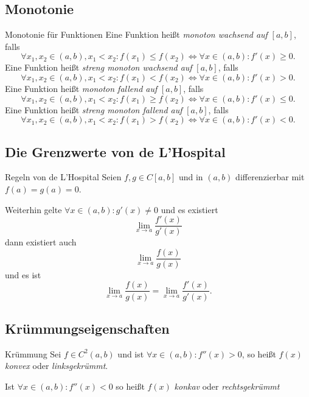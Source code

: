 \documentclass[german]{../spicker}
\begin{document}
\subsection{Monotonie}

\begin{defi}{Monotonie für Funktionen}
    Eine Funktion heißt \emph{monoton wachsend auf} $[a, b]$, falls
    $$
        \forall x_1, x_2 \in (a, b), x_1 < x_2 : f(x_1) \leq f(x_2) \iff \forall x \in (a, b): f'(x) \geq 0.
    $$
    Eine Funktion heißt \emph{streng monoton wachsend auf} $[a, b]$, falls
    $$
        \forall x_1, x_2 \in (a, b), x_1 < x_2 : f(x_1) < f(x_2) \iff \forall x \in (a, b): f'(x) > 0.
    $$
    Eine Funktion heißt \emph{monoton fallend auf} $[a, b]$, falls
    $$
        \forall x_1, x_2 \in (a, b), x_1 < x_2 : f(x_1) \geq f(x_2) \iff \forall x \in (a, b): f'(x) \leq 0.
    $$
    Eine Funktion heißt \emph{streng monoton fallend auf} $[a, b]$, falls
    $$
        \forall x_1, x_2 \in (a, b), x_1 < x_2 : f(x_1) > f(x_2) \iff \forall x \in (a, b): f'(x) < 0.
    $$
\end{defi}

\subsection{Die Grenzwerte von de L'Hospital}

\begin{defi}{Regeln von de L'Hospital}
    Seien $f, g \in C[a, b]$ und in $(a, b)$ differenzierbar mit $f(a) = g(a) = 0$.

    Weiterhin gelte $\forall x \in (a, b): g'(x) \neq 0$ und es existiert
    $$
        \lim_{x\to a} \frac{f'(x)}{g'(x)}
    $$
    dann existiert auch
    $$
        \lim_{x\to a } \frac{f(x)}{g(x)}
    $$
    und es ist
    $$
        \lim_{x\to a } \frac{f(x)}{g(x)} = \lim_{x\to a} \frac{f'(x)}{g'(x)}.
    $$
\end{defi}

\subsection{Krümmungseigenschaften}

\begin{defi}{Krümmung}
    Sei $f\in C^2(a, b)$ und ist $\forall x \in (a, b) : f''(x) > 0$, so heißt $f(x)$ \emph{konvex} oder \emph{linksgekrümmt}.

    Ist $\forall x \in (a, b) : f''(x) < 0$ so heißt $f(x)$ \emph{konkav} oder \emph{rechtsgekrümmt}
\end{defi}
\end{document}
